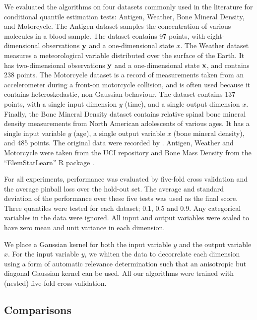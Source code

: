 \documentclass[twoside]{article} \usepackage{aistats2017}
\theoremstyle{definition}
\begin{document}
	We evaluated the algorithms on four datasets commonly used in the literature for conditional quantile estimation tests: Antigen, Weather, Bone Mineral Density, and Motorcycle. The Antigen dataset samples the concentration of various molecules \citep{Quadrianto2009} in a blood sample. The dataset contains 97 points, with eight-dimensional observations $\mathbf{y}$ and a one-dimensional state $x$. The Weather dataset measures a meteorological variable distributed over the surface of the Earth. It has two-dimensional observations $\mathbf{y}$ and a one-dimensional state $\mathbf{x}$, and contains 238 points. The Motorcycle dataset is a record of measurements taken from an accelerometer during a front-on motorcycle collision, and is often used because it contains heteroskedastic, non-Gaussian behaviour. The dataset contains 137 points, with a single input dimension $y$ (time), and a single output dimension $x$. Finally, the Bone Mineral Density dataset contains relative spinal bone mineral density measurements from North American adolescents of various ages. It has a single input variable $y$ (age), a single output variable $x$ (bone mineral density), and 485 points. The original data were recorded by \cite{Bachrach1999}. Antigen, Weather and Motorcycle were taken from the UCI repository \citep{Bache2013} and Bone Mass Density from the ``ElemStatLearn'' R package \citep{Hastie2005}.
	
	For all experiments, performance was evaluated by five-fold cross validation and the average pinball loss over the hold-out set. The average and standard deviation of the performance over these five tests was used as the final score. Three quantiles were tested for each dataset; 0.1, 0.5 and 0.9. Any categorical variables in the data were ignored. All input and output variables were scaled to have zero mean and unit variance in each dimension.
	
	We place a Gaussian kernel for both the input variable $y$ and the output variable $x$. For the input variable $y$, we whiten the data to decorrelate each dimension using a form of automatic relevance determination \citep{Rasmussen2006} such that an anisotropic but diagonal Gaussian kernel can be used. All our algorithms were trained with (nested) five-fold cross-validation.
	
	\subsection{Comparisons}
	\label{sec:experiments:comparison}
	
\end{document}
